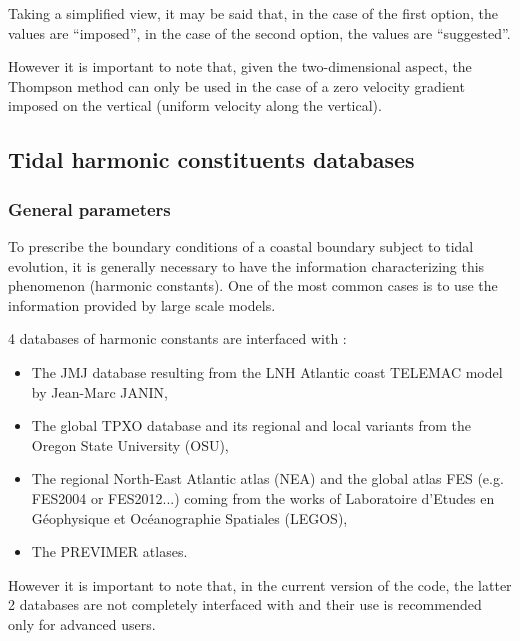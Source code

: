 Taking a simplified view, it may be said that, in the case of the first
option, the values are ``imposed'', in the case of the second option, the
values are ``suggested''.

However it is important to note that, given the two-dimensional aspect, the
Thompson method can only be used in the case of a zero velocity gradient
imposed on the vertical (uniform velocity along the vertical).


\subsection{Tidal harmonic constituents databases}
\label{sec:tide}


\subsubsection{General parameters}

To prescribe the boundary conditions of a coastal boundary subject to tidal
evolution, it is generally necessary to have the information characterizing
this phenomenon (harmonic constants). One of the most common cases is to use
the information provided by large scale models.

4 databases of harmonic constants are interfaced with :

\begin{itemize}
\item The JMJ database resulting from the LNH Atlantic coast TELEMAC model
by Jean-Marc JANIN,

\item The global TPXO database and its regional and local variants from
the Oregon State University (OSU),

\item The regional North-East Atlantic atlas (NEA) and the global atlas
FES (e.g. FES2004 or FES2012...) coming from the works of Laboratoire
d'Etudes en Géophysique et Océanographie Spatiales (LEGOS),

\item The PREVIMER atlases.
\end{itemize}

However it is important to note that, in the current version of the code, the
latter 2 databases are not completely interfaced with  and their use
is recommended only for advanced users.

